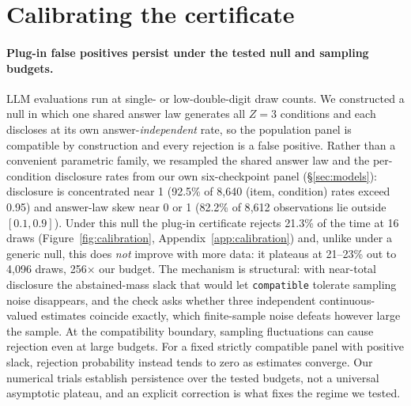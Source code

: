 \section{Calibrating the certificate}
\label{sec:calibration}

\paragraph{Plug-in false positives persist under the tested null and sampling budgets.}
LLM evaluations run at single- or low-double-digit draw counts. We constructed a
null in which one shared answer law generates all $Z=3$ conditions and each
discloses at its own answer-\emph{independent} rate, so the population panel
is compatible by construction and every rejection is a false positive. Rather
than a convenient parametric family, we resampled the shared answer law and
the per-condition disclosure rates from our own six-checkpoint panel
(\S\ref{sec:models}): disclosure is concentrated near 1 (92.5\% of 8{,}640
(item, condition) rates exceed 0.95) and answer-law skew near 0 or 1 (82.2\%
of 8{,}612 observations lie outside $[0.1,0.9]$). Under this null the plug-in
certificate rejects 21.3\% of the time at 16 draws
(Figure~\ref{fig:calibration}, Appendix~\ref{app:calibration}) and, unlike under a generic null, this does
\emph{not} improve with more data: it plateaus at 21--23\% out to 4{,}096
draws, 256$\times$ our budget. The mechanism is structural: with near-total
disclosure the abstained-mass slack that would let \texttt{compatible}
tolerate sampling noise disappears, and the check asks whether three
independent continuous-valued estimates coincide exactly, which finite-sample
noise defeats however large the sample. At the compatibility boundary,
sampling fluctuations can cause rejection even at large budgets. For a fixed
strictly compatible panel with positive slack, rejection probability instead
tends to zero as estimates converge. Our numerical trials establish persistence
over the tested budgets, not a universal asymptotic plateau, and an explicit
correction is what fixes the regime we tested.

